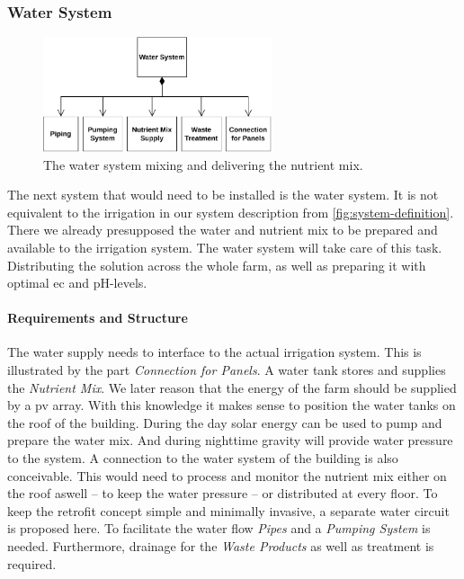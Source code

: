 \subsubsection{Water System}
\begin{figure}
	\includegraphics[width=0.6\textwidth]{img/architecture/water.pdf}
	\caption{The water system mixing and delivering the nutrient mix.}
	\label{wfig:water}
\end{figure} 
The next system that would need to be installed is the water system.
It is not equivalent to the irrigation in our system description from \ref{fig:system-definition}.
There we already presupposed the water and nutrient mix to be prepared and available to the irrigation system.
The water system will take care of this task.
Distributing the solution across the whole farm, as well as preparing it with optimal \ac{ec} and pH-levels.
\paragraph{Requirements and Structure}
The water supply needs to interface to the actual irrigation system.
This is illustrated by the part \textit{Connection for Panels}.
A water tank stores and supplies the \textit{Nutrient Mix}.
We later reason that the energy of the farm should be supplied by a \ac{pv} array.
With this knowledge it makes sense to position the water tanks on the roof of the building.
During the day solar energy can be used to pump and prepare the water mix.
And during nighttime gravity will provide water pressure to the system.
A connection to the water system of the building is also conceivable.
This would need to process and monitor the nutrient mix either on the roof aswell -- to keep the water pressure -- or distributed at every floor.
To keep the retrofit concept simple and minimally invasive, a separate water circuit is proposed here.
To facilitate the water flow \textit{Pipes} and a \textit{Pumping System} is needed.
Furthermore, drainage for the \textit{Waste Products} as well as treatment is required.

